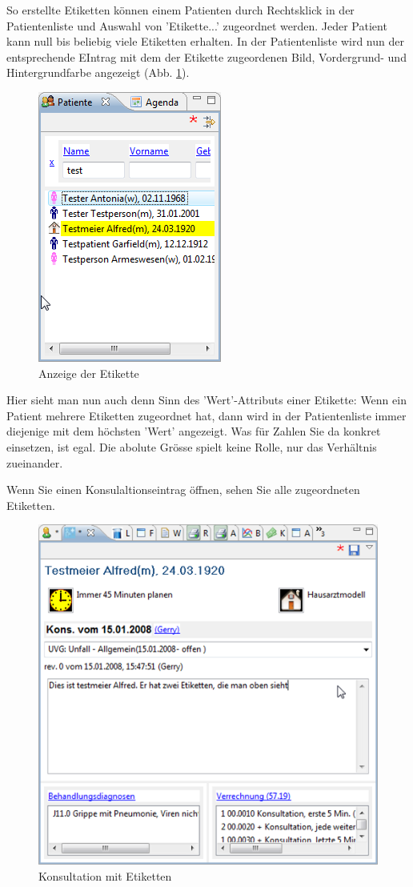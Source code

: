 So erstellte Etiketten können einem Patienten durch Rechtsklick in der Patientenliste und Auswahl von 'Etikette...' zugeordnet werden. Jeder Patient kann null bis beliebig viele Etiketten erhalten. In der Patientenliste wird nun der entsprechende EIntrag mit dem der Etikette zugeordenen Bild, Vordergrund- und Hintergrundfarbe angezeigt (Abb. \ref{fig:etiketten2}).
\begin{figure}
    \includegraphics{images/etikette3}
    \caption{Anzeige der Etikette}
    \label{fig:etiketten2}
\end{figure}

Hier sieht man nun auch denn Sinn des 'Wert'-Attributs einer Etikette: Wenn ein Patient mehrere Etiketten zugeordnet hat, dann wird in der Patientenliste immer diejenige mit dem höchsten 'Wert' angezeigt. Was für Zahlen Sie da konkret einsetzen, ist egal. Die abolute Grösse spielt keine Rolle, nur das Verhältnis zueinander.

\medskip

Wenn Sie einen Konsulaltionseintrag öffnen, sehen Sie alle zugeordneten Etiketten.
\begin{figure}
    \includegraphics{images/etikette2}
    \caption{Konsultation mit Etiketten}
    \label{fig:etiketten3}
\end{figure}


